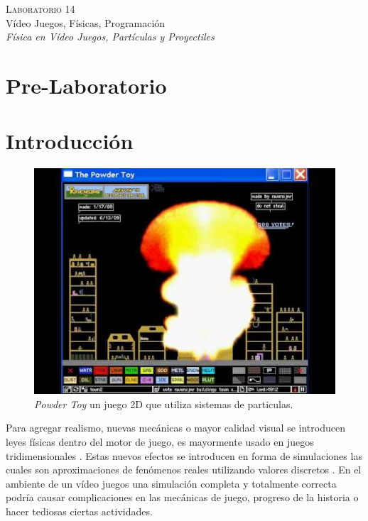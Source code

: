 \begin{center}
\textsc{\Large Laboratorio 14}~\\
{\large Vídeo Juegos, Físicas, Programación}~\\
\emph{Física en Vídeo Juegos, Partículas y Proyectiles}
\end{center}

\section{Pre-Laboratorio}

\section{Introducción}
\setlength\intextsep{0pt}
\begin{figure}
\includegraphics[width=\linewidth]{semana14/powdertoy.jpg}
\caption{\emph{Powder Toy} un juego 2D que utiliza sistemas de particulas.}
\label{fig:particles}
\end{figure}
Para agregar realismo, nuevas mecánicas o mayor calidad visual se introducen leyes físicas dentro del motor de juego, es mayormente usado en juegos tridimensionales \cite[p.~325]{jenkinscreatinggames}. Estas nuevos efectos se introducen en forma de simulaciones las cuales son aproximaciones de fenómenos reales utilizando valores discretos \cite{ian_gamephysics}. En el ambiente de un vídeo juegos una simulación completa y totalmente correcta podría causar complicaciones en las mecánicas de juego, progreso de la historia o hacer tediosas ciertas actividades.

